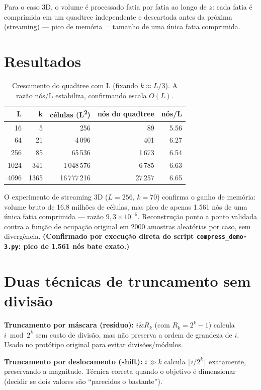 \documentclass[11pt,a4paper]{article}
\begin{document}
Para o caso 3D, o volume é processado fatia por fatia ao longo de $z$: cada fatia é comprimida em um quadtree independente e descartada antes da próxima (streaming) --- pico de memória = tamanho de uma única fatia comprimida.

\section{Resultados}

\begin{table}[h]
\centering
\begin{tabular}{rrrrr}
\toprule
L & k & células (L\textsuperscript{2}) & nós do quadtree & nós/L \\
\midrule
16   & 5    & 256        & 89     & 5.56 \\
64   & 21   & 4\,096     & 401    & 6.27 \\
256  & 85   & 65\,536    & 1\,673 & 6.54 \\
1024 & 341  & 1\,048\,576& 6\,785 & 6.63 \\
4096 & 1365 & 16\,777\,216 & 27\,257 & 6.65 \\
\bottomrule
\end{tabular}
\caption{Crescimento do quadtree com L (fixando $k \approx L/3$). A razão nós/L estabiliza, confirmando escala $O(L)$.}
\end{table}

O experimento de streaming 3D ($L=256$, $k=70$) confirma o ganho de memória: volume bruto de 16,8 milhões de células, mas pico de apenas 1.561 nós de uma única fatia comprimida --- razão $9{,}3 \times 10^{-5}$. Reconstrução ponto a ponto validada contra a função de ocupação original em 2000 amostras aleatórias por caso, sem divergência. \textbf{(Confirmado por execução direta do script \texttt{compress\_demo-3.py}: pico de 1.561 nós bate exato.)}

\section{Duas técnicas de truncamento sem divisão}

\textbf{Truncamento por máscara (resíduo):} $i \mathbin{\&} R_k$ (com $R_k = 2^k - 1$) calcula $i \bmod 2^k$ sem custo de divisão, mas não preserva a ordem de grandeza de $i$. Usado no protótipo original para evitar divisões/módulos.

\textbf{Truncamento por deslocamento (shift):} $i \gg k$ calcula $\lfloor i/2^k \rfloor$ exatamente, preservando a magnitude. Técnica correta quando o objetivo é dimensionar (decidir se dois valores são ``parecidos o bastante'').
\end{document}
